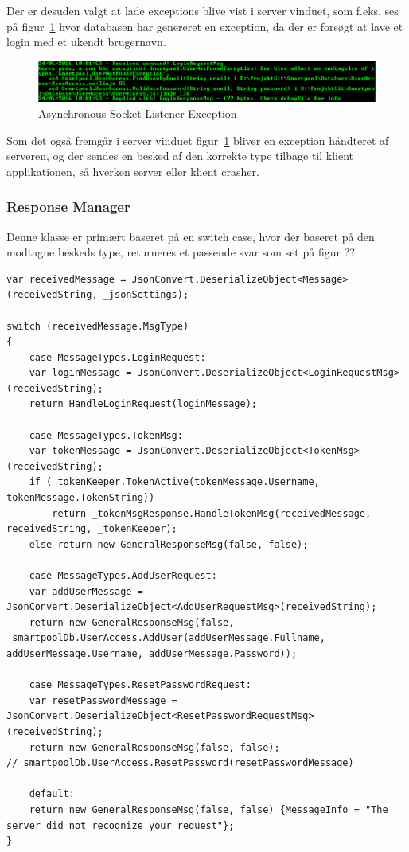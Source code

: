 Der er desuden valgt at lade exceptions blive vist i server vinduet, som f.eks. ses på figur~\ref{fig:asynchronousSocketListenerException} hvor databasen har genereret en exception, da der er forsøgt at lave et login med et ukendt brugernavn.

\begin{figure}
	\centering
	\includegraphics[width=0.9\linewidth]{figs/connection/asynchronousSocketListenerException.png}
	\caption{Asynchronous Socket Listener Exception}
	\label{fig:asynchronousSocketListenerException}
\end{figure}

Som det også fremgår i server vinduet figur~\ref{fig:asynchronousSocketListenerException} bliver en exception håndteret af serveren, og der sendes en besked af den korrekte type tilbage til klient applikationen, så hverken server eller klient crasher.

\subsubsection{Response Manager}
Denne klasse er primært baseret på en switch case, hvor der baseret på den modtagne beskeds type, returneres et passende svar som set på figur ??
\begin{lstlisting}[caption=Server.ResponseManager, label=code:Server.ResponseManager]
var receivedMessage = JsonConvert.DeserializeObject<Message>(receivedString, _jsonSettings);

switch (receivedMessage.MsgType)
{
	case MessageTypes.LoginRequest:
	var loginMessage = JsonConvert.DeserializeObject<LoginRequestMsg>(receivedString);
	return HandleLoginRequest(loginMessage);
	
	case MessageTypes.TokenMsg:
	var tokenMessage = JsonConvert.DeserializeObject<TokenMsg>(receivedString);
	if (_tokenKeeper.TokenActive(tokenMessage.Username, tokenMessage.TokenString))
		return _tokenMsgResponse.HandleTokenMsg(receivedMessage, receivedString, _tokenKeeper);
	else return new GeneralResponseMsg(false, false);
	
	case MessageTypes.AddUserRequest:
	var addUserMessage = JsonConvert.DeserializeObject<AddUserRequestMsg>(receivedString);
	return new GeneralResponseMsg(false, _smartpoolDb.UserAccess.AddUser(addUserMessage.Fullname, addUserMessage.Username, addUserMessage.Password));
	
	case MessageTypes.ResetPasswordRequest:
	var resetPasswordMessage = JsonConvert.DeserializeObject<ResetPasswordRequestMsg>(receivedString);
	return new GeneralResponseMsg(false, false); //_smartpoolDb.UserAccess.ResetPassword(resetPasswordMessage)
	
	default:
	return new GeneralResponseMsg(false, false)	{MessageInfo = "The server did not recognize your request"};
}
\end{lstlisting}

